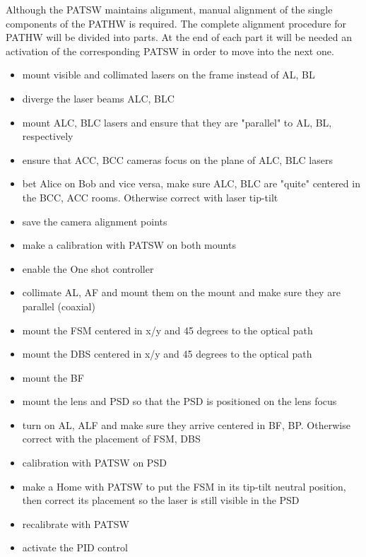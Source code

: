 Although the PATSW maintains alignment, manual alignment of the single components of the PATHW is required.
The complete alignment procedure for PATHW will be divided into parts. At the end of each part it will be needed an activation of the corresponding PATSW in order to move into the next one.
\begin{itemize}
  \item mount visible and collimated lasers on the frame instead of AL, BL
  \item diverge the laser beams ALC, BLC
  \item mount ALC, BLC lasers and ensure that they are "parallel" to AL, BL, respectively
  \item ensure that ACC, BCC cameras focus on the plane of ALC, BLC lasers
  \item bet Alice on Bob and vice versa, make sure ALC, BLC are "quite" centered in the BCC, ACC rooms. Otherwise correct with laser tip-tilt
  \item save the camera alignment points
  \item make a calibration with PATSW on both mounts
  \item enable the One shot controller
\end{itemize}

\begin{itemize}
  \item collimate AL, AF and mount them on the mount and make sure they are parallel (coaxial)
  \item mount the FSM centered in x/y and 45 degrees to the optical path
  \item mount the DBS centered in x/y and 45 degrees to the optical path
  \item mount the BF
  \item mount the lens and PSD so that the PSD is positioned on the lens focus
  \item turn on AL, ALF and make sure they arrive centered in BF, BP. Otherwise correct with the placement of FSM, DBS
  \item calibration with PATSW on PSD
  \item make a Home with PATSW to put the FSM in its tip-tilt neutral position, then correct its placement so the laser is still visible in the PSD
  \item recalibrate with PATSW
  \item activate the PID control
\end{itemize}

